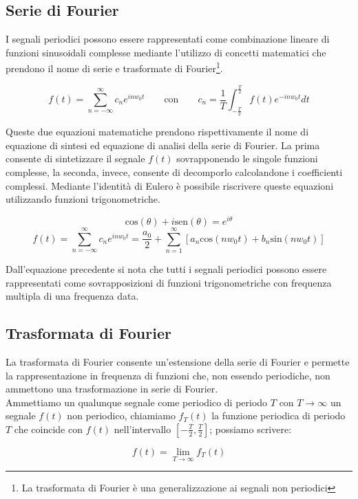 \documentclass[12pt]{report}
\begin{document}
		\subsection{Serie di Fourier}
		\label{cap2sec3_2}
		
		I segnali periodici possono essere rappresentati come combinazione lineare di funzioni sinusoidali complesse mediante l'utilizzo di concetti matematici che prendono il nome di serie e trasformate di Fourier\footnote{La trasformata di Fourier è una generalizzazione ai segnali non periodici}.
		
$$ f(t) = \sum_{n = -\infty}^{\infty} c_ne^{inw_0t} \qquad \mbox{con} \qquad c_n = \frac{1}{T}\int_{-\frac{T}{2}}^\frac{T}{2}f(t)e^{-inw_0t}dt$$

Queste due equazioni matematiche prendono rispettivamente il nome di equazione di sintesi ed equazione di analisi della serie di Fourier. La prima consente di sintetizzare il segnale $ f(t) $ sovrapponendo le singole funzioni complesse, la seconda, invece, consente di decomporlo calcolandone i coefficienti complessi.
Mediante l'identità di Eulero è possibile riscrivere queste equazioni utilizzando funzioni trigonometriche.

$$ \mbox{cos}(\theta) + i\mbox{sen}(\theta) = e^{i\theta} $$
$$ f(t) = \sum_{n=-\infty}^\infty c_n e^{inw_0t} = \frac{a_0}{2} + 
\sum_{n=1}^\infty [a_n\mbox{cos}(nw_0t)+ b_n\mbox{sin}(nw_0t)]$$

Dall'equazione precedente si nota che tutti i segnali periodici possono essere rappresentati come sovrapposizioni di funzioni trigonometriche con frequenza multipla di una frequenza data.
				
		\subsection{Trasformata di Fourier}
		\label{cap2sec3_3}
		
		La trasformata di Fourier consente un'estensione della serie di Fourier e permette la rappresentazione in frequenza di funzioni che, non essendo periodiche, non ammettono una trasformazione in serie di Fourier.\\
Ammettiamo un qualunque segnale come periodico di periodo $T$ con $T\rightarrow\infty$ un segnale $f(t)$ non periodico, chiamiamo $f_T(t)$ la funzione periodica di periodo $T$ che coincide con $f(t)$ nell'intervallo $[-\frac{T}{2},\frac{T}{2}]$; possiamo scrivere:

$$ f(t) = \lim_{T\rightarrow\infty} f_T(t) $$
\end{document}
